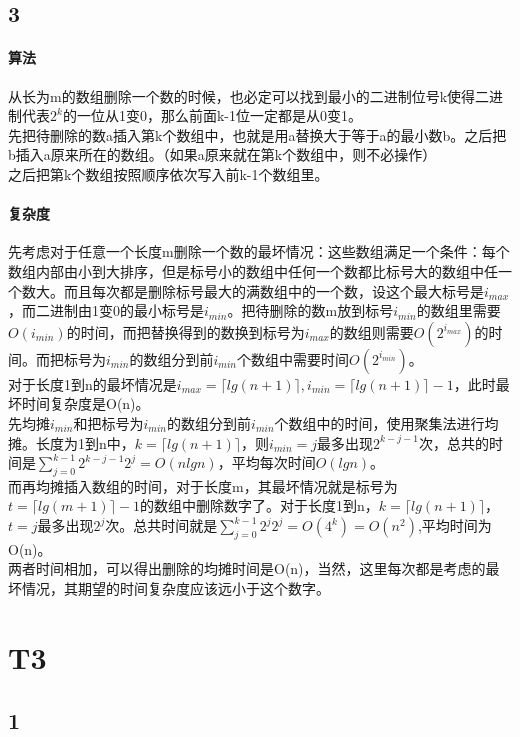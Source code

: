 \documentclass{article}
\begin{document}
\begin{CJK}{UTF8}{gkai}
\subsection{3}
\paragraph{算法}
从长为m的数组删除一个数的时候，也必定可以找到最小的二进制位号k使得二进制代表$2^{k}$的一位从1变0，那么前面k-1位一定都是从0变1。\\
先把待删除的数a插入第k个数组中，也就是用a替换大于等于a的最小数b。之后把b插入a原来所在的数组。（如果a原来就在第k个数组中，则不必操作）\\
之后把第k个数组按照顺序依次写入前k-1个数组里。\\
\paragraph{复杂度}
先考虑对于任意一个长度m删除一个数的最坏情况：这些数组满足一个条件：每个数组内部由小到大排序，但是标号小的数组中任何一个数都比标号大的数组中任一个数大。而且每次都是删除标号最大的满数组中的一个数，设这个最大标号是$i_{max}$，而二进制由1变0的最小标号是$i_{min}$。把待删除的数m放到标号$i_{min}$的数组里需要$O(i_{min})$的时间，而把替换得到的数换到标号为$i_{max}$的数组则需要$O(2^{i_{max}})$的时间。而把标号为$i_{min}$的数组分到前$i_{min}$个数组中需要时间$O(2^{i_{min}})$。\\
对于长度1到n的最坏情况是$i_{max}=\lceil lg(n+1) \rceil,i_{min}=\lceil lg(n+1) \rceil-1$，此时最坏时间复杂度是O(n)。\\
先均摊$i_{min}$和把标号为$i_{min}$的数组分到前$i_{min}$个数组中的时间，使用聚集法进行均摊。长度为1到n中，$k=\lceil lg(n+1) \rceil$，则$i_{min}=j$最多出现$2^{k-j-1}$次，总共的时间是$\sum_{j=0}^{k-1}2^{k-j-1}2^{j}=O(nlgn)$，平均每次时间$O(lgn)$。\\
而再均摊插入数组的时间，对于长度m，其最坏情况就是标号为$t=\lceil lg(m+1) \rceil-1$的数组中删除数字了。对于长度1到n，$k=\lceil lg(n+1) \rceil$，$t=j$最多出现$2^{j}$次。总共时间就是$\sum_{j=0}^{k-1}2^{j}2^{j}=O(4^{k})=O(n^{2})$,平均时间为O(n)。\\
两者时间相加，可以得出删除的均摊时间是O(n)，当然，这里每次都是考虑的最坏情况，其期望的时间复杂度应该远小于这个数字。
\section{T3} 
\subsection{1}

\end{CJK}
\end{document}

